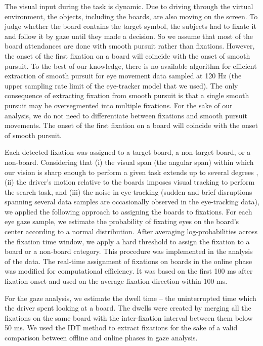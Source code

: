 \documentclass[12pt]{iopart}
\begin{document}
The visual input during the task is dynamic. Due to driving through
the virtual environment, the objects, including the boards, are also moving on the screen. To judge whether the board contains the target symbol, the subjects had to fixate it and follow it by gaze until they made a decision.
So we assume that most of the board attendances are done with
smooth pursuit rather than fixations. However, the onset of the first fixation on a board will coincide with the onset of smooth pursuit.
To the best of our knowledge, there is no available algorithm for efficient
extraction of smooth pursuit for eye movement data sampled at 120 Hz (the upper sampling rate limit of the eye-tracker model that we used). The only consequence of 
extracting fixation from smooth pursuit is that a single smooth pursuit
may be oversegmented into multiple fixations.
For the sake of our analysis, we do not need to differentiate between
fixations and smooth pursuit movements. The onset of the first fixation on a board
will coincide with the onset of smooth pursuit.

Each detected fixation was assigned to a target board, a non-target board, or a non-board.
Considering that (i) the visual span (the angular span) within which our vision is sharp enough to perform a given task extends up to several degrees \cite{legge_psychophysics_2001}, (ii) the driver's motion relative to the boards imposes visual tracking to perform the search task, and (iii) the noise in eye-tracking (sudden and brief disruptions spanning several data samples are occasionally observed in the eye-tracking data), we applied the following approach to assigning the boards to fixations. 
For each eye gaze sample, we estimate the probability of
fixating eyes on the board's center according to a normal distribution.
After averaging log-probabilities across the fixation time window, we apply a hard
threshold to assign the fixation to a board or a non-board category.
This procedure was implemented in the analysis of the data.
The real-time assignment of fixations on boards in the online phase was
modified for computational efficiency. It was based
on the first 100 ms after fixation onset and
used on the average fixation direction within 100 ms.

For the gaze analysis, we estimate 
the dwell time -- the uninterrupted time which the driver spent looking at a board.
The dwells were created
by merging all the fixations on the same board with the inter-fixation interval 
between them below 50 ms.
We used the IDT method to extract fixations for the sake of a valid comparison
between offline and online phases in gaze analysis.
\end{document}
